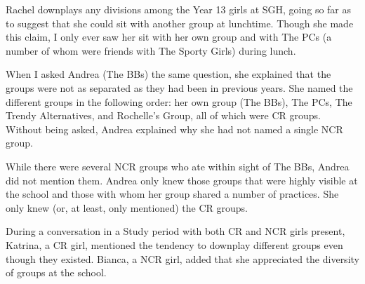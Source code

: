 \noindent Rachel downplays any divisions among the Year 13 girls at SGH, going so far as to suggest that she could sit with another group at lunchtime. Though she made this claim, I only ever saw her sit with her own group and with The PCs (a number of whom were friends with The Sporty Girls) during lunch. 


When I asked Andrea (The BBs) the same question, she explained that the groups were not as separated as they had been in previous years. She named the different groups in the following order: her own group (The BBs), The PCs, The Trendy Alternatives, and Rochelle's Group, all of which were CR groups. Without being asked, Andrea explained why she had not named a single NCR group.

\label{ex:thispartoflawn}

\vspace{5 mm}

\noindent While there were several NCR groups who ate within sight of The BBs, Andrea did not mention them. Andrea only knew those groups that were highly visible at the school and those with whom her group shared a number of practices. She only knew (or, at least, only mentioned) the CR groups.

During a conversation in a Study period with both CR and NCR girls present, Katrina, a CR girl, mentioned the tendency to downplay different groups even though they existed. Bianca, a NCR girl, added that she appreciated the diversity of groups at the school.

